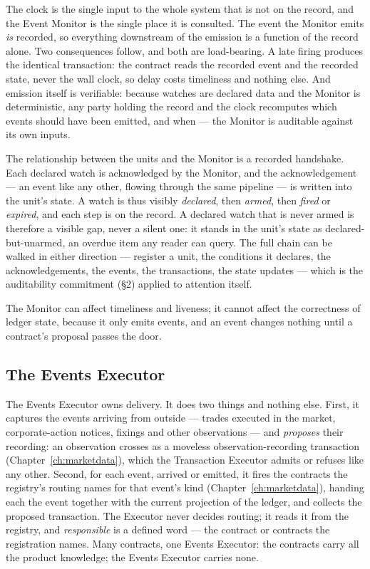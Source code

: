 \documentclass[11pt,a4paper]{article}
\begin{document}
The clock is the single input to the whole system that is not on the record,
and the Event Monitor is the single place it is consulted. The event the
Monitor emits \emph{is} recorded, so everything downstream of the emission is a
function of the record alone. Two consequences follow, and both are
load-bearing. A late firing produces the identical transaction: the contract
reads the recorded event and the recorded state, never the wall clock, so delay
costs timeliness and nothing else. And emission itself is verifiable: because
watches are declared data and the Monitor is deterministic, any party holding
the record and the clock recomputes which events should have been emitted, and
when --- the Monitor is auditable against its own inputs.

The relationship between the units and the Monitor is a recorded handshake.
Each declared watch is acknowledged by the Monitor, and the acknowledgement ---
an event like any other, flowing through the same pipeline --- is written into
the unit's state. A watch is thus visibly \emph{declared}, then \emph{armed},
then \emph{fired} or \emph{expired}, and each step is on the record. A declared
watch that is never armed is therefore a visible gap, never a silent one: it
stands in the unit's state as declared-but-unarmed, an overdue item any reader
can query. The full chain can be walked in either direction --- register a
unit, the conditions it declares, the acknowledgements, the events, the
transactions, the state updates --- which is the auditability commitment
(\S2) applied to attention itself.

The Monitor can affect timeliness and liveness; it cannot affect the
correctness of ledger state, because it only emits events, and an event changes
nothing until a contract's proposal passes the door.

\subsection{The Events Executor}

The Events Executor owns delivery. It does two things and nothing else. First,
it captures the events arriving from outside --- trades executed in the market,
corporate-action notices, fixings and other observations --- and \emph{proposes}
their recording: an observation crosses as a moveless observation-recording
transaction (Chapter~\ref{ch:marketdata}), which the Transaction Executor admits
or refuses like any other. Second, for each event, arrived or emitted, it fires the contracts the registry's
routing names for that event's kind (Chapter~\ref{ch:marketdata}), handing each the event
together with the current projection of the ledger, and collects the proposed transaction.
The Executor never decides routing; it reads it from the registry, and \emph{responsible}
is a defined word --- the contract or contracts the registration names. Many
contracts, one Events Executor: the contracts carry all the product knowledge;
the Events Executor carries none.
\end{document}
